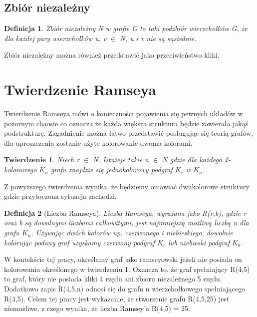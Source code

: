 \documentclass[11pt]{article}
\newtheorem{theorem}{Twierdzenie}
\newtheorem{definition}{Definicja}[section]
\begin{document}
  \subsection{Zbiór niezależny}
  \begin{definition}
    Zbiór niezależny N w grafie G to taki podzbiór wierzchołków G, że dla każdej pary wierzchołków u, v $\in$ N, u i v nie są sąsiednie. 
  \end{definition}
  
    Zbiór niezależny można również przedstawić jako przeciwieństwo kliki.
   

\section{Twierdzenie Ramseya}

Twierdzenie Ramseya mówi o konieczności pojawienia się pewnych układów w pozornym chaosie co oznacza że każda większa struktura będzie zawierała jakąś podstrukturę. Zagadnienie można łatwo przedstawić posługując się teorią grafów, dla uproszczenia zostanie użyte kolorowanie dwoma kolorami.

\begin{theorem}
Niech r $\in$ N. Istnieje takie n $\in$ N gdzie dla każdego 2-kolorowego $\mathit{K}_{n}$ grafu znajdzie się jednokolorowy podgraf $\mathit{K}_{r}$ w $\mathit{K}_{n}$.  \cite{theory} 
\end{theorem}

Z powyższego twierdzenia wynika, że będziemy omawiać dwukolorowe struktury gdzie przytoczona sytuacja zachodzi. 

\begin{definition}[Liczba Ramseya]
Liczba Ramseya, wyrażana jako R(r,b), gdzie r oraz b są dowolnymi liczbami całkowitymi, jest najmniejszą możliwą liczbą n dla grafu $\mathit{K}_{n}$. Używając dwóch kolorów np. czerwonego i niebieskiego, dowolnie kolorując podany graf uzyskamy czerwony podgraf $\mathit{K}_{r}$ lub niebieski podgraf $\mathit{K}_{b}$.  \cite{theory} 
\end{definition}

W kontekście tej pracy, określamy graf jako ramseyowski jeżeli nie posiada on kolorowania określonego w twierdzeniu 1. Oznacza to, że graf spełniający R(4,5) to graf, który nie posiada kliki 4 rzędu ani zbioru niezależnego 5 rzędu. Dodatkowo zapis R(4,5,n) odnosi się do grafu n wierzchołkowego spełniającego R(4,5). 
Celem tej pracy jest wykazanie, że stworzenie grafu R(4,5,25) jest niemożliwe, z czego wynika, że liczba Ramsey'a R(4,5) = 25.
\end{document}
